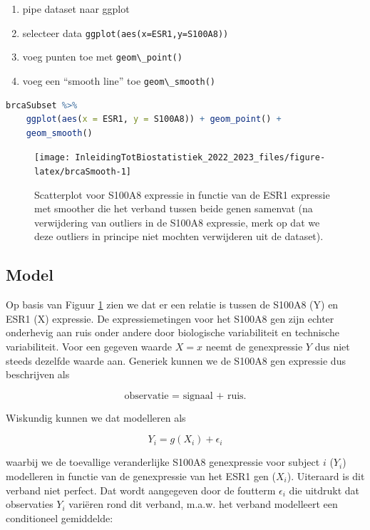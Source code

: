 \documentclass[
  12pt,dutch,coursenotes]{book}
\newcommand{\passthrough}[1]{#1}
\providecommand{\tightlist}{%
  \setlength{\itemsep}{0pt}\setlength{\parskip}{0pt}}
\begin{document}
\begin{enumerate}
\def\labelenumi{\arabic{enumi}.}
\tightlist
\item
  pipe dataset naar ggplot
\item
  selecteer data \passthrough{\lstinline!ggplot(aes(x=ESR1,y=S100A8))!}
\item
  voeg punten toe met \passthrough{\lstinline!geom\_point()!}
\item
  voeg een ``smooth line'' toe \passthrough{\lstinline!geom\_smooth()!}
\end{enumerate}

\begin{lstlisting}[language=R]
brcaSubset %>%
    ggplot(aes(x = ESR1, y = S100A8)) + geom_point() +
    geom_smooth()
\end{lstlisting}

\begin{figure}

{\centering \texttt{[image: InleidingTotBiostatistiek\_2022\_2023\_files/figure-latex/brcaSmooth-1]} 

}

\caption{Scatterplot voor S100A8 expressie in functie van de ESR1 expressie met smoother die het verband tussen beide genen samenvat (na verwijdering van outliers in de S100A8 expressie, merk op dat we deze outliers in principe niet mochten verwijderen uit de dataset).}\label{fig:brcaSmooth}
\end{figure}

\hypertarget{model}{%
\subsection{Model}\label{model}}

Op basis van Figuur \ref{fig:brcaSmooth} zien we dat er een relatie is tussen de S100A8 (Y) en ESR1 (X) expressie.
De expressiemetingen voor het S100A8 gen zijn echter onderhevig aan ruis onder andere door biologische variabiliteit en technische variabiliteit.
Voor een gegeven waarde \(X=x\) neemt de genexpressie \(Y\) dus niet steeds dezelfde waarde aan.
Generiek kunnen we de S100A8 gen expressie dus beschrijven als

\[\text{observatie = signaal + ruis.}\]

Wiskundig kunnen we dat modelleren als

\[Y_i=g(X_i)+\epsilon_i\]

waarbij we de toevallige veranderlijke S100A8 genexpressie voor subject \(i\) (\(Y_i\)) modelleren in functie van de genexpressie van het ESR1 gen (\(X_i\)). Uiteraard is dit verband niet perfect. Dat wordt aangegeven door de foutterm \(\epsilon_i\) die uitdrukt dat observaties \(Y_i\) variëren rond dit verband, m.a.w.
het verband modelleert een conditioneel gemiddelde:
\end{document}
